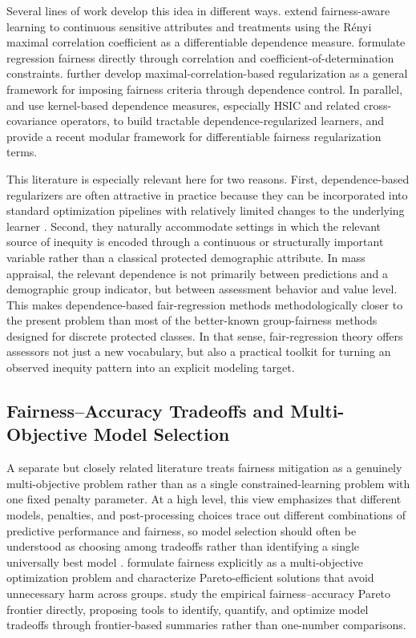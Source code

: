 \documentclass[12pt, draft]{article}
\theoremstyle{plain}
\theoremstyle{definition}
\newcommand{\1}{\mathbf{1}}
\begin{document}
Several lines of work develop this idea in different ways. \textcite{MaryEtAl2019} extend fairness-aware learning to continuous sensitive attributes and treatments using the R\'enyi maximal correlation coefficient as a differentiable dependence measure. \textcite{KomiyamaEtAl2018} formulate regression fairness directly through correlation and coefficient-of-determination constraints. \textcite{lee2022maximal} further develop maximal-correlation-based regularization as a general framework for imposing fairness criteria through dependence control. In parallel, \textcite{PerezSuayEtAl2017} and \textcite{LiEtAl2022Fairness} use kernel-based dependence measures, especially HSIC and related cross-covariance operators, to build tractable dependence-regularized learners, and \textcite{BuylDefranceDeBie2024FAIRRET} provide a recent modular framework for differentiable fairness regularization terms.

This literature is especially relevant here for two reasons. First, dependence-based regularizers are often attractive in practice because they can be incorporated into standard optimization pipelines with relatively limited changes to the underlying learner \cite{KomiyamaEtAl2018,MaryEtAl2019,LiEtAl2022Fairness,lee2022maximal,BuylDefranceDeBie2024FAIRRET}. Second, they naturally accommodate settings in which the relevant source of inequity is encoded through a continuous or structurally important variable rather than a classical protected demographic attribute. In mass appraisal, the relevant dependence is not primarily between predictions and a demographic group indicator, but between assessment behavior and value level. This makes dependence-based fair-regression methods methodologically closer to the present problem than most of the better-known group-fairness methods designed for discrete protected classes. In that sense, fair-regression theory offers assessors not just a new vocabulary, but also a practical toolkit for turning an observed inequity pattern into an explicit modeling target.

\subsection{Fairness--Accuracy Tradeoffs and Multi-Objective Model Selection}

A separate but closely related literature treats fairness mitigation as a genuinely multi-objective problem rather than as a single constrained-learning problem with one fixed penalty parameter. At a high level, this view emphasizes that different models, penalties, and post-processing choices trace out different combinations of predictive performance and fairness, so model selection should often be understood as choosing among tradeoffs rather than identifying a single universally best model \cite{CatonHaas2024}. \textcite{martinez2020minimax} formulate fairness explicitly as a multi-objective optimization problem and characterize Pareto-efficient solutions that avoid unnecessary harm across groups. \textcite{little2022fairness} study the empirical fairness--accuracy Pareto frontier directly, proposing tools to identify, quantify, and optimize model tradeoffs through frontier-based summaries rather than one-number comparisons.
\end{document}
